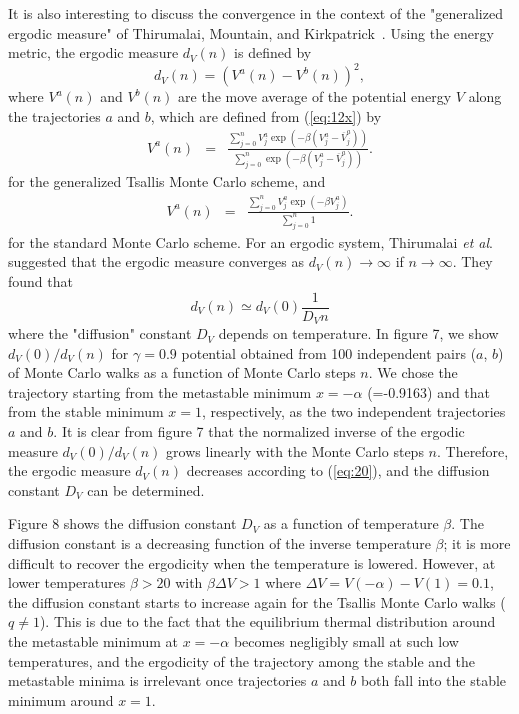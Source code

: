 It is also interesting to discuss the convergence in the context of
the "generalized ergodic measure" of Thirumalai, Mountain, and
Kirkpatrick~\cite{TMK,AS3}. Using the energy metric, the ergodic measure
$d_{V}(n)$ is defined by
\begin{equation}
d_{V}(n)=\left(V^{a}(n)-V^{b}(n)\right)^{2},
\label{eq:18}
\end{equation}
where $V^{a}(n)$ and $V^{b}(n)$ are the move average of the potential
energy $V$ along the trajectories $a$ and $b$, which
are defined from (\ref{eq:12x}) by
\begin{eqnarray}
V^{a}(n)&=&\frac{\sum_{j=0}^{n} V_{j}^{a} \exp\left(-\beta\left(V_{j}^{a}- 
\overline{V}_{j}^{a}\right)\right)}
{\sum_{j=0}^{n} \exp\left(-\beta\left(V_{j}^{a}-
\overline{V}_{j}^{a}\right)\right)}.
\label{eq:19}
\end{eqnarray}
for the generalized Tsallis Monte Carlo scheme, and
\begin{eqnarray}
V^{a}(n)&=&\frac{\sum_{j=0}^{n} V_{j}^{a} \exp\left(-\beta V_{j}^{a}\right)}
{\sum_{j=0}^{n}1}.
\label{eq:19x}
\end{eqnarray}
for the standard Monte Carlo scheme.
For an ergodic system, Thirumalai {\it et al}.~\cite{TMK} suggested that
the ergodic measure converges as $d_{V}(n)\rightarrow \infty$ if
$n\rightarrow \infty$.  They found that
\begin{equation}
d_{V}(n)\simeq d_{V}(0)\frac{1}{D_{V}n}
\label{eq:20}
\end{equation}
where the "diffusion" constant $D_{V}$ depends on temperature.  In figure
7, we show $d_{V}(0)/d_{V}(n)$ for $\gamma=0.9$ potential obtained from 100
independent pairs ($a$, $b$) of Monte Carlo walks as a function of Monte Carlo
steps $n$.  We chose the trajectory starting from the metastable minimum
$x=-\alpha$  (=-0.9163) and that from the stable minimum $x=1$,
respectively, as the two independent trajectories $a$ and $b$.  It is
clear from figure 7 that the normalized inverse of the ergodic measure
$d_{V}(0)/d_{V}(n)$ grows linearly with the Monte Carlo steps $n$.
Therefore, the ergodic measure $d_{V}(n)$ decreases according to
(\ref{eq:20}), and the diffusion constant $D_{V}$ can be determined.

Figure 8 shows the diffusion constant $D_{V}$ as a function of temperature
$\beta$.  The diffusion constant is a decreasing function of the inverse
temperature $\beta$; it is more difficult to recover the ergodicity when
the temperature is lowered.  However, at lower temperatures $\beta>20$ with
$\beta\Delta V>1$ where $\Delta V=V(-\alpha)-V(1)=0.1$, the diffusion
constant starts to increase again for the Tsallis Monte Carlo walks ($q\neq
1$).  This is due to the fact that the equilibrium thermal distribution
around the metastable minimum at $x=-\alpha$ becomes negligibly small at
such low temperatures, and the ergodicity of the trajectory among the
stable and the metastable minima is
irrelevant once trajectories $a$ and $b$ both fall into the stable
minimum around $x=1$.


